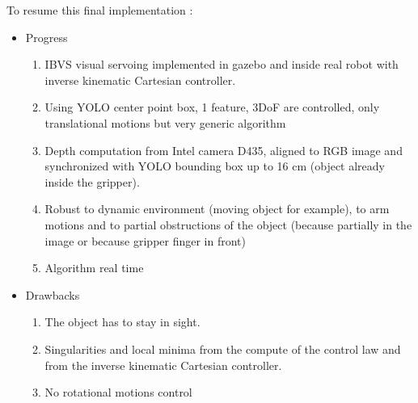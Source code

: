 To resume this final implementation :
\begin{itemize}
    \item Progress
    \begin{enumerate}
        \item 
IBVS visual servoing implemented in gazebo and inside real robot with inverse kinematic Cartesian controller.
        \item 
Using YOLO center point box, 1 feature, 3DoF are controlled, only translational motions but very generic algorithm
        \item 
Depth computation from Intel camera D435, aligned to RGB image and synchronized with YOLO bounding box up to 16 cm (object already inside the gripper).
        \item
Robust to dynamic environment (moving object for example), to arm motions and to partial obstructions of the object (because partially in the image or because gripper finger in front)
        \item 
Algorithm real time
    \end{enumerate}
    \item Drawbacks
    \begin{enumerate}
        \item The object has to stay in sight. 
        \item Singularities and local minima from the compute of the control law and from the inverse kinematic Cartesian controller.
        \item No rotational motions control 
    \end{enumerate}
\end{itemize}




